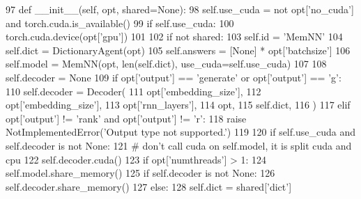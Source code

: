 \begin{DoxyCode}
97     \textcolor{keyword}{def }\_\_init\_\_(self, opt, shared=None):
98         self.use\_cuda = \textcolor{keywordflow}{not} opt[\textcolor{stringliteral}{'no\_cuda'}] \textcolor{keywordflow}{and} torch.cuda.is\_available()
99         \textcolor{keywordflow}{if} self.use\_cuda:
100             torch.cuda.device(opt[\textcolor{stringliteral}{'gpu'}])
101 
102         \textcolor{keywordflow}{if} \textcolor{keywordflow}{not} shared:
103             self.id = \textcolor{stringliteral}{'MemNN'}
104             self.dict = DictionaryAgent(opt)
105             self.answers = [\textcolor{keywordtype}{None}] * opt[\textcolor{stringliteral}{'batchsize'}]
106             self.model = MemNN(opt, len(self.dict), use\_cuda=self.use\_cuda)
107 
108             self.decoder = \textcolor{keywordtype}{None}
109             \textcolor{keywordflow}{if} opt[\textcolor{stringliteral}{'output'}] == \textcolor{stringliteral}{'generate'} \textcolor{keywordflow}{or} opt[\textcolor{stringliteral}{'output'}] == \textcolor{stringliteral}{'g'}:
110                 self.decoder = Decoder(
111                     opt[\textcolor{stringliteral}{'embedding\_size'}],
112                     opt[\textcolor{stringliteral}{'embedding\_size'}],
113                     opt[\textcolor{stringliteral}{'rnn\_layers'}],
114                     opt,
115                     self.dict,
116                 )
117             \textcolor{keywordflow}{elif} opt[\textcolor{stringliteral}{'output'}] != \textcolor{stringliteral}{'rank'} \textcolor{keywordflow}{and} opt[\textcolor{stringliteral}{'output'}] != \textcolor{stringliteral}{'r':}
118 \textcolor{stringliteral}{                }\textcolor{keywordflow}{raise} NotImplementedError(\textcolor{stringliteral}{'Output type not supported.'})
119 
120             \textcolor{keywordflow}{if} self.use\_cuda \textcolor{keywordflow}{and} self.decoder \textcolor{keywordflow}{is} \textcolor{keywordflow}{not} \textcolor{keywordtype}{None}:
121                 \textcolor{comment}{# don't call cuda on self.model, it is split cuda and cpu}
122                 self.decoder.cuda()
123             \textcolor{keywordflow}{if} opt[\textcolor{stringliteral}{'numthreads'}] > 1:
124                 self.model.share\_memory()
125                 \textcolor{keywordflow}{if} self.decoder \textcolor{keywordflow}{is} \textcolor{keywordflow}{not} \textcolor{keywordtype}{None}:
126                     self.decoder.share\_memory()
127         \textcolor{keywordflow}{else}:
128             self.dict = shared[\textcolor{stringliteral}{'dict'}]

\end{DoxyCode}
